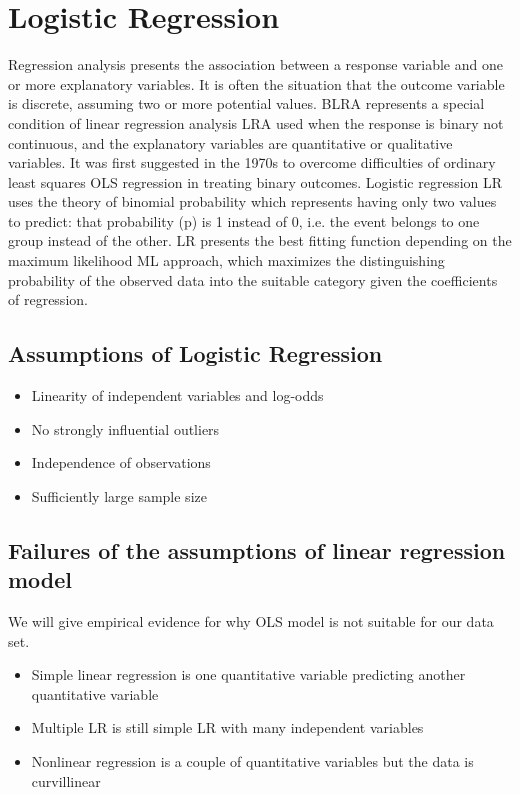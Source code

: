\documentclass[11pt]{article}
\begin{document}
\section{Logistic Regression}
Regression analysis presents the association between a response variable and one or more explanatory variables. It is often the situation that the outcome variable is discrete, assuming two or more potential values. BLRA represents a special condition of linear regression analysis LRA used when the response is binary not continuous, and the explanatory variables are quantitative or qualitative variables. It was first suggested in the 1970s to overcome difficulties of ordinary least squares OLS regression in treating binary outcomes. Logistic regression LR uses the theory of binomial probability which represents having only  two values to predict: that probability (p) is 1 instead of 0, i.e. the event belongs to one group instead of the other. LR presents the best fitting function depending on the maximum likelihood ML approach, which maximizes the distinguishing probability of the observed data into the suitable category given the coefficients of regression.

\subsection{Assumptions of Logistic Regression}
\begin{itemize}
  \item Linearity of independent variables and log-odds
  \item No strongly influential outliers
  \item Independence of observations
  \item Sufficiently large sample size
\end{itemize}

\subsection{Failures of the assumptions of linear regression model}
We will give empirical evidence for why OLS model is not suitable for our data set.\\
\begin{itemize}
    \item Simple linear regression is one quantitative variable predicting another quantitative variable
    \item Multiple LR is still simple LR with many independent variables
    \item Nonlinear regression is a couple of quantitative variables but the data is curvillinear
\end{itemize}
\end{document}
